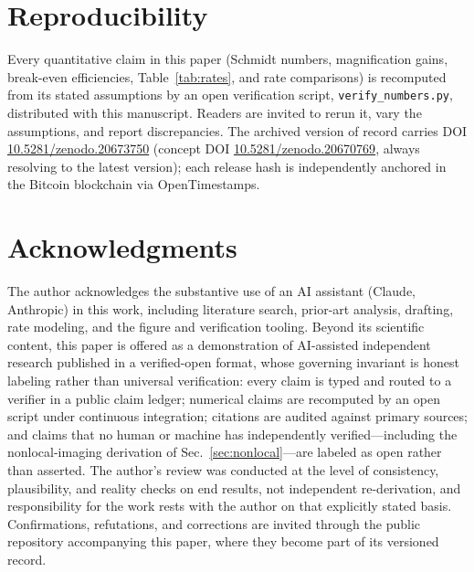 \documentclass[11pt]{article}
\begin{document}
\section*{Reproducibility}
Every quantitative claim in this paper (Schmidt numbers, magnification gains, break-even efficiencies, Table~\ref{tab:rates}, and rate comparisons) is recomputed from its stated assumptions by an open verification script, \texttt{verify\_numbers.py}, distributed with this manuscript. Readers are invited to rerun it, vary the assumptions, and report discrepancies. The archived version of record carries DOI \href{https://doi.org/10.5281/zenodo.20673750}{10.5281/zenodo.20673750} (concept DOI \href{https://doi.org/10.5281/zenodo.20670769}{10.5281/zenodo.20670769}, always resolving to the latest version); each release hash is independently anchored in the Bitcoin blockchain via OpenTimestamps.

\section*{Acknowledgments}
The author acknowledges the substantive use of an AI assistant (Claude, Anthropic) in this work, including literature search, prior-art analysis, drafting, rate modeling, and the figure and verification tooling. Beyond its scientific content, this paper is offered as a demonstration of AI-assisted independent research published in a verified-open format, whose governing invariant is honest labeling rather than universal verification: every claim is typed and routed to a verifier in a public claim ledger; numerical claims are recomputed by an open script under continuous integration; citations are audited against primary sources; and claims that no human or machine has independently verified---including the nonlocal-imaging derivation of Sec.~\ref{sec:nonlocal}---are labeled as open rather than asserted. The author's review was conducted at the level of consistency, plausibility, and reality checks on end results, not independent re-derivation, and responsibility for the work rests with the author on that explicitly stated basis. Confirmations, refutations, and corrections are invited through the public repository accompanying this paper, where they become part of its versioned record.
\end{document}
